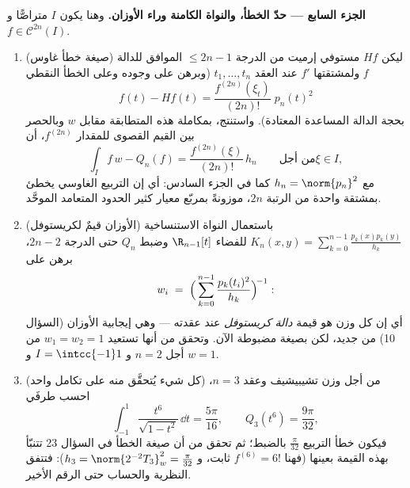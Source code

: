 \begin{problem}
\medskip
\noindent\textbf{الجزء السابع --- حدّ الخطأ، والنواة الكامنة
وراء الأوزان.} وهنا يكون $I$ متراصًّا و $f \in \mathcal
C^{2n}(I)$.
\begin{enumerate}[resume]
  \item (صيغة خطأ غاوس) ليكن $Hf$ مستوفي إرميت من الدرجة
        $\leq 2n - 1$ الموافق للدالة $f$ ولمشتقتها $f'$ عند
        العقد $t_1, \dots, t_n$ (وبرهن على وجوده وعلى الخطأ النقطي
        \[
        f(t) - Hf(t) =
        \frac{f^{(2n)}(\xi_t)}{(2n)!}\;p_n(t)^2
        \]
        بحجة الدالة المساعدة المعتادة). واستنتج، بمكاملة هذه
        المتطابقة مقابل $w$ وبالحصر بين القيم القصوى للمقدار
        $f^{(2n)}$، أن
        \[
        \int_I f\,w - Q_n(f)
        = \frac{f^{(2n)}(\xi)}{(2n)!}\,h_n
        \qquad\text{من أجل} \xi \in I,
        \]
        مع $h_n = \norm{p_n}^2$ كما في الجزء السادس: أي إن التربيع الغاوسي
        يخطئ بمشتقة واحدة من الرتبة $2n$، موزونةً بمربّع معيار
        كثير الحدود المتعامد الموحَّد.
  \item (الأوزان قيمٌ لكريستوفل) باستعمال النواة الاستنساخية
        $K_n(x, y) = \sum_{k=0}^{n-1}
        \frac{p_k(x)p_k(y)}{h_k}$ للفضاء $\R_{n-1}[t]$ وضبط $Q_n$ حتى الدرجة
        $2n - 2$، برهن على
        \[
        w_i \;=\;
        \Bigl(\,\sum_{k=0}^{n-1}
        \frac{p_k(t_i)^2}{h_k}\Bigr)^{\!-1} :
        \]
        أي إن كل وزن هو قيمة \emph{دالة كريستوفل} عند عقدته
        --- وهي إيجابية الأوزان (السؤال 10) من جديد، لكن
        بصيغة مضبوطة الآن. وتحقق من أنها تستعيد
        $w_1 = w_2 = 1$ من أجل $n =
        2$ و $I = \intcc{-1}1$ و $w = 1$.
  \item (كل شيء يُتحقَّق منه على تكامل واحد) من أجل وزن
        تشيبيشيف وعقد $n = 3$، احسب طرفَي
        \[
        \int_{-1}^{1}\frac{t^6}{\sqrt{1 - t^2}}\,\dd t
        = \frac{5\pi}{16},
        \qquad
        Q_3(t^6) = \frac{9\pi}{32},
        \]
        فيكون خطأ التربيع $\frac{\pi}{32}$ بالضبط؛ ثم تحقق من
        أن صيغة الخطأ في السؤال 23 تتنبّأ بهذه القيمة بعينها
        (فهنا $f^{(6)} = 6!$ ثابت، و $h_3 = \norm{2^{-2}T_3}_w^2 =
        \frac\pi{32}$): فتتفق النظرية
        والحساب حتى الرقم الأخير.
\end{enumerate}
\end{problem}
